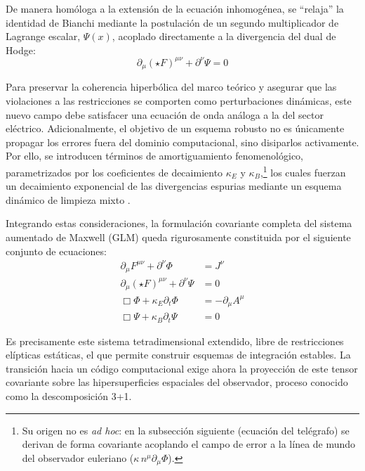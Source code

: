 De manera homóloga a la extensión de la ecuación inhomogénea, se ``relaja'' la identidad de Bianchi mediante la postulación de un segundo multiplicador de Lagrange escalar, $\Psi(x)$, acoplado directamente a la divergencia del dual de Hodge:
\begin{equation}
\label{eq:Bianchi_Extendida_Psi}
    \partial_\mu (\star F)^{\mu\nu} + \partial^\nu \Psi = 0
\end{equation}

Para preservar la coherencia hiperbólica del marco teórico y asegurar que las violaciones a las restricciones se comporten como perturbaciones dinámicas, este nuevo campo debe satisfacer una ecuación de onda análoga a la del sector eléctrico. Adicionalmente, el objetivo de un esquema robusto no es únicamente propagar los errores fuera del dominio computacional, sino disiparlos activamente. Por ello, se introducen términos de amortiguamiento fenomenológico, parametrizados por los coeficientes de decaimiento $\kappa_E$ y $\kappa_B$,\footnote{Su origen no es \emph{ad hoc}: en la subsección siguiente (ecuación del telégrafo) se derivan de forma covariante acoplando el campo de error a la línea de mundo del observador euleriano ($\kappa\,n^\mu\partial_\mu\Phi$).} los cuales fuerzan un decaimiento exponencial de las divergencias espurias mediante un esquema dinámico de limpieza mixto \parencite{gomes2015}. 

Integrando estas consideraciones, la formulación covariante completa del sistema aumentado de Maxwell (GLM) queda rigurosamente constituida por el siguiente conjunto de ecuaciones:
\begin{align}
    \partial_\mu F^{\mu\nu} + \partial^\nu \Phi &= J^\nu \label{eq:GLM_Cov_1}\\
    \partial_\mu (\star F)^{\mu\nu} + \partial^\nu \Psi &= 0 \label{eq:GLM_Cov_2}\\
    \Box \Phi + \kappa_E \partial_t \Phi &= -\partial_\mu A^\mu \label{eq:GLM_Cov_3}\\
    \Box \Psi + \kappa_B \partial_t \Psi &= 0 \label{eq:GLM_Cov_4}
\end{align}

Es precisamente este sistema tetradimensional extendido, libre de restricciones elípticas estáticas, el que permite construir esquemas de integración estables. La transición hacia un código computacional exige ahora la proyección de este tensor covariante sobre las hipersuperficies espaciales del observador, proceso conocido como la descomposición 3+1.

